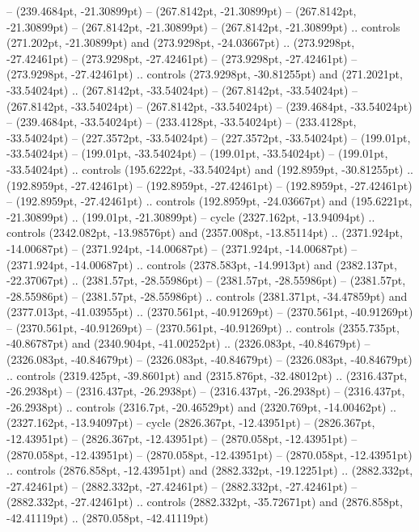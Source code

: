  -- (239.4684pt, -21.30899pt)
 -- (267.8142pt, -21.30899pt)
 -- (267.8142pt, -21.30899pt)
 -- (267.8142pt, -21.30899pt)
 -- (267.8142pt, -21.30899pt) .. controls (271.202pt, -21.30899pt) and (273.9298pt, -24.03667pt) .. (273.9298pt, -27.42461pt)
 -- (273.9298pt, -27.42461pt)
 -- (273.9298pt, -27.42461pt)
 -- (273.9298pt, -27.42461pt) .. controls (273.9298pt, -30.81255pt) and (271.2021pt, -33.54024pt) .. (267.8142pt, -33.54024pt)
 -- (267.8142pt, -33.54024pt)
 -- (267.8142pt, -33.54024pt)
 -- (267.8142pt, -33.54024pt)
 -- (239.4684pt, -33.54024pt)
 -- (239.4684pt, -33.54024pt)
 -- (233.4128pt, -33.54024pt)
 -- (233.4128pt, -33.54024pt)
 -- (227.3572pt, -33.54024pt)
 -- (227.3572pt, -33.54024pt)
 -- (199.01pt, -33.54024pt)
 -- (199.01pt, -33.54024pt)
 -- (199.01pt, -33.54024pt)
 -- (199.01pt, -33.54024pt) .. controls (195.6222pt, -33.54024pt) and (192.8959pt, -30.81255pt) .. (192.8959pt, -27.42461pt)
 -- (192.8959pt, -27.42461pt)
 -- (192.8959pt, -27.42461pt)
 -- (192.8959pt, -27.42461pt) .. controls (192.8959pt, -24.03667pt) and (195.6221pt, -21.30899pt) .. (199.01pt, -21.30899pt) -- cycle
(2327.162pt, -13.94094pt) .. controls (2342.082pt, -13.98576pt) and (2357.008pt, -13.85114pt) .. (2371.924pt, -14.00687pt)
 -- (2371.924pt, -14.00687pt)
 -- (2371.924pt, -14.00687pt)
 -- (2371.924pt, -14.00687pt) .. controls (2378.583pt, -14.9913pt) and (2382.137pt, -22.37067pt) .. (2381.57pt, -28.55986pt)
 -- (2381.57pt, -28.55986pt)
 -- (2381.57pt, -28.55986pt)
 -- (2381.57pt, -28.55986pt) .. controls (2381.371pt, -34.47859pt) and (2377.013pt, -41.03955pt) .. (2370.561pt, -40.91269pt)
 -- (2370.561pt, -40.91269pt)
 -- (2370.561pt, -40.91269pt)
 -- (2370.561pt, -40.91269pt) .. controls (2355.735pt, -40.86787pt) and (2340.904pt, -41.00252pt) .. (2326.083pt, -40.84679pt)
 -- (2326.083pt, -40.84679pt)
 -- (2326.083pt, -40.84679pt)
 -- (2326.083pt, -40.84679pt) .. controls (2319.425pt, -39.8601pt) and (2315.876pt, -32.48012pt) .. (2316.437pt, -26.2938pt)
 -- (2316.437pt, -26.2938pt)
 -- (2316.437pt, -26.2938pt)
 -- (2316.437pt, -26.2938pt) .. controls (2316.7pt, -20.46529pt) and (2320.769pt, -14.00462pt) .. (2327.162pt, -13.94097pt) -- cycle
(2826.367pt, -12.43951pt) -- (2826.367pt, -12.43951pt)
 -- (2826.367pt, -12.43951pt)
 -- (2870.058pt, -12.43951pt)
 -- (2870.058pt, -12.43951pt)
 -- (2870.058pt, -12.43951pt)
 -- (2870.058pt, -12.43951pt) .. controls (2876.858pt, -12.43951pt) and (2882.332pt, -19.12251pt) .. (2882.332pt, -27.42461pt)
 -- (2882.332pt, -27.42461pt)
 -- (2882.332pt, -27.42461pt)
 -- (2882.332pt, -27.42461pt) .. controls (2882.332pt, -35.72671pt) and (2876.858pt, -42.41119pt) .. (2870.058pt, -42.41119pt)
